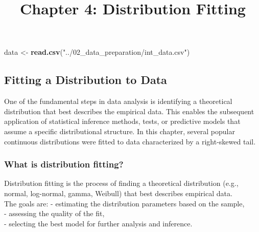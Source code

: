 \documentclass[
]{article}
\title{Chapter 4: Distribution Fitting}
\author{}
\date{\vspace{-2.5em}}
\newenvironment{Shaded}{\begin{snugshade}}{\end{snugshade}}
\newcommand{\AttributeTok}[1]{\textcolor[rgb]{0.13,0.29,0.53}{#1}}
\newcommand{\FunctionTok}[1]{\textcolor[rgb]{0.13,0.29,0.53}{\textbf{#1}}}
\newcommand{\NormalTok}[1]{#1}
\newcommand{\OtherTok}[1]{\textcolor[rgb]{0.56,0.35,0.01}{#1}}
\newcommand{\SpecialCharTok}[1]{\textcolor[rgb]{0.81,0.36,0.00}{\textbf{#1}}}
\newcommand{\StringTok}[1]{\textcolor[rgb]{0.31,0.60,0.02}{#1}}
\begin{document}
\maketitle

\begin{Shaded}
\begin{Highlighting}[]
\NormalTok{data }\OtherTok{\textless{}{-}} \FunctionTok{read.csv}\NormalTok{(}\StringTok{"../02\_data\_preparation/int\_data.csv"}\NormalTok{)}
\end{Highlighting}
\end{Shaded}

\begin{Shaded}
\end{Shaded}

\subsection{Fitting a Distribution to
Data}\label{fitting-a-distribution-to-data}

One of the fundamental steps in data analysis is identifying a
theoretical distribution that best describes the empirical data. This
enables the subsequent application of statistical inference methods,
tests, or predictive models that assume a specific distributional
structure. In this chapter, several popular continuous distributions
were fitted to data characterized by a right-skewed tail.

\subsubsection{What is distribution
fitting?}\label{what-is-distribution-fitting}

Distribution fitting is the process of finding a theoretical
distribution (e.g., normal, log-normal, gamma, Weibull) that best
describes empirical data.\\
The goals are: - estimating the distribution parameters based on the
sample,\\
- assessing the quality of the fit,\\
- selecting the best model for further analysis and inference.
\end{document}
